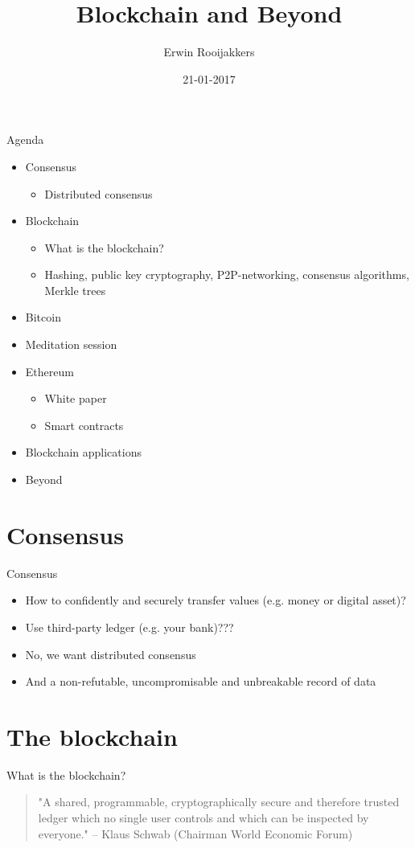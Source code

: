 \documentclass[presentation]{beamer}
\author{Erwin Rooijakkers}
\date{21-01-2017}
\title{Blockchain and Beyond}
\begin{document}
\maketitle

\begin{frame}[label=sec-0-1]{Agenda}
\begin{itemize}
\item Consensus
\begin{itemize}
\item Distributed consensus
\end{itemize}
\item Blockchain
\begin{itemize}
\item What is the blockchain?
\item Hashing, public key cryptography, P2P-networking, consensus algorithms, Merkle trees
\end{itemize}
\item \alert{Bitcoin}
\item Meditation session
\item \alert{Ethereum}
\begin{itemize}
\item White paper
\item Smart contracts
\end{itemize}
\item Blockchain applications
\item Beyond
\end{itemize}
\end{frame}

\section{Consensus}
\label{sec-1}
\begin{frame}[label=sec-1-1]{Consensus}
\begin{itemize}
\item How to \alert{confidently} and \alert{securely} transfer \alert{values} (e.g. money or digital asset)?
\item Use third-party ledger (e.g. your bank)???
\item \alert{No}, we want \alert{distributed consensus}
\item And a \alert{non-refutable}, \alert{uncompromisable} and \alert{unbreakable record} of data
\end{itemize}
\end{frame}
\section{The blockchain}
\label{sec-2}
\begin{frame}[label=sec-2-1]{What is the blockchain?}
\begin{quotation}
"A shared, programmable, cryptographically secure and therefore trusted ledger
which no single user controls and which can be inspected by everyone." -- Klaus
Schwab (Chairman World Economic Forum)
\end{quotation}
\end{frame}
\end{document}
